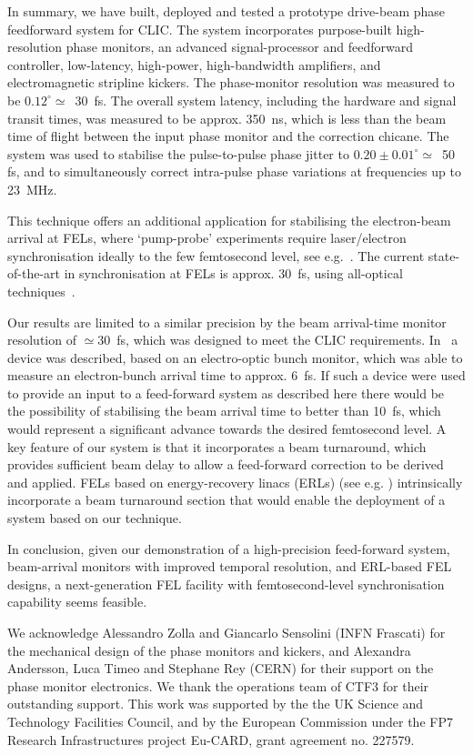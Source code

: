 \documentclass[%
 reprint,
 superscriptaddress,
 amsmath,
 amssymb,
 prl,
]{revtex4-1}
\begin{document}

In summary, we have built, deployed and tested a prototype drive-beam phase 
feedforward system for CLIC.   The system incorporates purpose-built 
high-resolution phase 
monitors, an advanced signal-processor and feedforward controller, low-latency, 
high-power, high-bandwidth amplifiers, and electromagnetic stripline
kickers. The phase-monitor resolution was measured to be 
\(0.12^\circ\simeq\)~30~fs.  The overall system latency, including the hardware 
and signal transit times, was measured to be approx. 350~ns, which is less than 
the beam time of flight between the input phase monitor and the correction 
chicane.
The system was used to 
stabilise the pulse-to-pulse phase jitter to \(0.20\pm0.01^\circ\simeq\)~50 fs, 
and to simultaneously correct intra-pulse phase variations at frequencies up to 
23~MHz.

This technique offers an additional application for stabilising the 
electron-beam arrival at FELs, where `pump-probe' 
experiments require laser/electron synchronisation ideally to the few 
femtosecond level, see e.g.~\cite{Savelyev2017}. 
The current state-of-the-art in synchronisation at FELs is approx. 30~fs, using 
all-optical techniques~\cite{FLASHnature}.

Our results are limited to a similar precision by the beam arrival-time monitor 
resolution of \(\simeq 30\)~fs, which was designed to meet the CLIC 
requirements. In~\cite{flashPRL} a device was described, based on an 
electro-optic bunch monitor, which was able to measure an electron-bunch 
arrival time to approx. 6~fs. If such a device were used to provide an input to 
a feed-forward system as described here there would be the possibility of 
stabilising the beam arrival time to better than 10~fs, which would represent a 
significant advance towards the desired femtosecond level. A key feature of our 
system is that it incorporates a beam turnaround, which provides sufficient 
beam delay to allow a feed-forward correction to be derived and applied. FELs 
based on energy-recovery linacs (ERLs) (see e.g. 
\cite{Sekutowicz2005,Kwang2008,Jackson2016}) intrinsically incorporate a beam 
turnaround section that would enable the deployment of a system based on our 
technique.

In conclusion, given our demonstration of a high-precision feed-forward system, 
beam-arrival 
monitors with improved temporal resolution, and ERL-based FEL designs, a 
next-generation FEL facility with femtosecond-level synchronisation capability 
seems feasible.

\begin{acknowledgments}
	We acknowledge Alessandro Zolla and Giancarlo Sensolini (INFN 
	Frascati) for the mechanical design of the phase monitors and 
	kickers, and Alexandra Andersson, Luca Timeo and Stephane Rey (CERN) for 
	their support on the phase monitor electronics. We thank the 
	operations team of CTF3 for their outstanding support. This work was  
	supported by the the UK Science and Technology Facilities 
	Council, and by the European Commission under the FP7 Research 
	Infrastructures project Eu-CARD, grant agreement no. 227579.
\end{acknowledgments}


\end{document}
